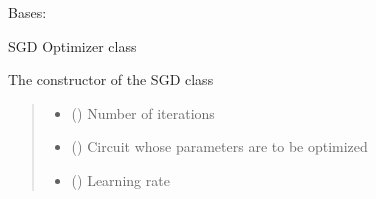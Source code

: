 \documentclass[letterpaper,10pt,english]{sphinxmanual}
\begin{document}
\begin{fulllineitems}
\begin{fulllineitems}
\begin{quote}
\begin{description}
\begin{itemize}
\end{itemize}

\end{description}\end{quote}

\end{fulllineitems}


\end{fulllineitems}


\begin{fulllineitems}
\label{\detokenize{qcompute_qapp.optimizer:qcompute_qapp.optimizer.SGD}}
\pysigstartsignatures
{}
\pysigstopsignatures
\sphinxAtStartPar
Bases: {\hyperref[\detokenize{qcompute_qapp.optimizer:qcompute_qapp.optimizer.BasicOptimizer}]{}}

\sphinxAtStartPar
SGD Optimizer class

\sphinxAtStartPar
The constructor of the SGD class
\begin{quote}\begin{description}
\begin{itemize}
\item {} 
\sphinxAtStartPar
{} () \textendash{} Number of iterations

\item {} 
\sphinxAtStartPar
{} ({\hyperref[\detokenize{qcompute_qapp.circuit:qcompute_qapp.circuit.BasicCircuit}]{}}) \textendash{} Circuit whose parameters are to be optimized

\item {} 
\sphinxAtStartPar
{} () \textendash{} Learning rate


\end{itemize}
\end{description}
\end{quote}
\end{fulllineitems}
\end{document}
